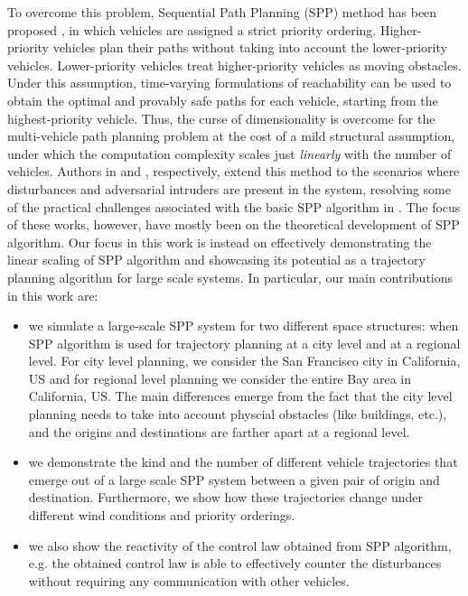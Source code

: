To overcome this problem, Sequential Path Planning (SPP) method has been proposed \cite{Chen15c}, in which vehicles are assigned a strict priority ordering. Higher-priority vehicles plan their paths without taking into account the lower-priority vehicles. Lower-priority vehicles treat higher-priority vehicles as moving obstacles. Under this assumption, time-varying formulations of reachability \cite{Bokanowski11, Fisac15} can be used to obtain the optimal and provably safe paths for each vehicle, starting from the highest-priority vehicle. Thus, the curse of dimensionality is overcome for the multi-vehicle path planning problem at the cost of a mild structural assumption, under which the computation complexity scales just \textit{linearly} with the number of vehicles. Authors in \cite{Bansal2017} and \cite{chen2016robust}, respectively, extend this method to the scenarios where disturbances and adversarial intruders are present in the system, resolving some of the practical challenges associated with the basic SPP algorithm in \cite{Chen15c}. The focus of these works, however, have mostly been on the theoretical development of SPP algorithm. Our focus in this work is instead on effectively demonstrating the linear scaling of SPP algorithm and showcasing its potential as a trajectory planning algorithm for large scale systems. In particular, our main contributions in this work are:
\begin{itemize}
\item we simulate a large-scale SPP system for two different space structures: when SPP algorithm is used for trajectory planning at a city level and at a regional level. For city level planning, we consider the San Francisco city in California, US and for regional level planning we consider the entire Bay area in California, US. The main differences emerge from the fact that the city level planning needs to take into account physcial obstacles (like buildings, etc.), and the origins and destinations are farther apart at a regional level.
\item we demonstrate the kind and the number of different vehicle trajectories that emerge out of a large scale SPP system between a given pair of origin and destination. Furthermore, we show how these trajectories change under different wind conditions and priority orderings.
\item we also show the reactivity of the control law obtained from SPP algorithm, e.g. the obtained control law is able to effectively counter the disturbances without requiring any communication with other vehicles.      
\end{itemize}

